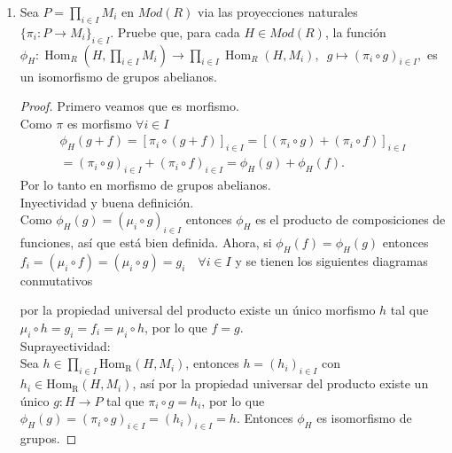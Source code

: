 \documentclass{article}
\begin{document}
\begin{enumerate}[label=\textbf{Ej \arabic*.}]
		
		
		\item Sea $P=\displaystyle\prod_{i \in I}M_{i}$ en $Mod(R)$ via las proyecciones naturales \\$\{\pi_i\colon P\longrightarrow M_i\}_{i\in I}$. 
		Pruebe que, para cada $H\in Mod(R)$, la función $\phi_H\colon \operatorname{Hom}_R(H,\displaystyle\prod_{i \in I}M_{i})
		\longrightarrow \prod_{i \in I}\operatorname{Hom}_R(H,M_{i}),\,\,\,g\mapsto (\pi_i\circ g)_{i\in I},$ es un isomorfismo de grupos abelianos. 
		\begin{proof}
			Primero veamos que es morfismo.\\
			Como $\pi$ es morfismo $\forall i\in I$
			\begin{gather*}
				\phi_H(g+f)=[\pi_i\circ (g+f)]_{i\in I}=[(\pi_i\circ g)+(\pi_i\circ f)]_{i\in I}\\
				= (\pi_i\circ g)_{i\in I}+ (\pi_i\circ f)_{i\in I}=\phi_H(g)+\phi_H(f).
			\end{gather*}
			Por lo tanto en morfismo de grupos abelianos.\\
			
			Inyectividad y buena definición.\\
			
			Como $\phi_H(g)= (\mu_i\circ g)_{i\in I}$ entonces $\phi_H$ es el producto de composiciones de funciones, así que está bien definida. Ahora,
			si $\phi_H(f)=\phi_H(g)$ entonces $ f_i=(\mu_i\circ f)=(\mu_i\circ g)=g_i\quad \forall i\in I $ y se tienen los siguientes diagramas conmutativos
			
			
			por la propiedad universal del producto existe un único morfismo $h$ tal que $\mu_i\circ h=g_i=f_i=\mu_i\circ h$, por lo que $f=g$.\\
			
			Suprayectividad:\\
			Sea $h\in \displaystyle\prod_{i\in I} \operatorname{Hom_R}(H,M_i)$, entonces $h=(h_i)_{i\in I}$ con $h_i\in \operatorname{Hom_R}(H,M_i)$,
			así por la propiedad universar del producto existe un único $g\colon H\longrightarrow P$ tal que $\pi_i\circ g=h_i$, por lo que 
			$\phi_H(g)=(\pi_i\circ g)_{i\in I}=(h_i)_{i\in I}=h$. Entonces $\phi_H$ es isomorfismo de grupos.
			

\end{proof}
\end{enumerate}
\end{document}
